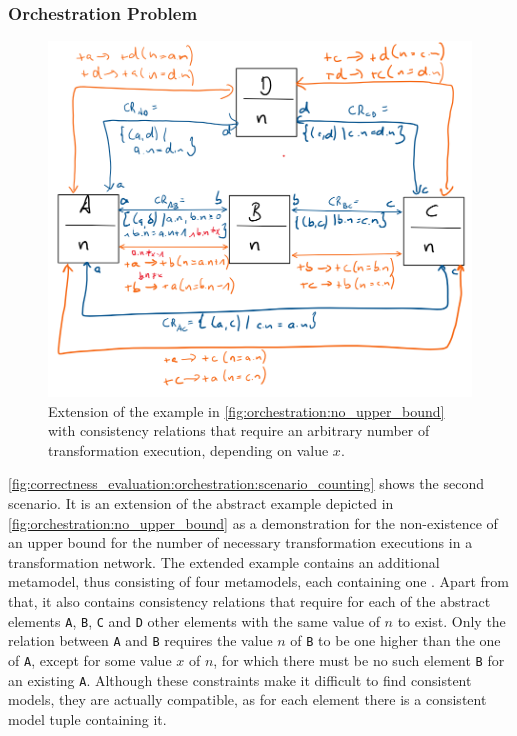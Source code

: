 

\subsubsection*{Orchestration Problem}

\begin{figure}
    \centering
    \includegraphics[width=\textwidth]{figures/correctness/evaluation/orchestration_scenario_counting.png}
    \caption[Example scenario with arbitrary execution Bound]{Extension of the example in \autoref{fig:orchestration:no_upper_bound} with consistency relations that require an arbitrary number of transformation execution, depending on value $x$.}
    \label{fig:correctness_evaluation:orchestration:scenario_counting}
\end{figure}

\autoref{fig:correctness_evaluation:orchestration:scenario_counting} shows the second scenario.
It is an extension of the abstract example depicted in \autoref{fig:orchestration:no_upper_bound} as a demonstration for the non-existence of an upper bound for the number of necessary transformation executions in a transformation network.
The extended example contains an additional metamodel, thus consisting of four metamodels, each containing one \metaclass. 
Apart from that, it also contains consistency relations that require for each of the abstract elements \texttt{A}, \texttt{B}, \texttt{C} and \texttt{D} other elements with the same value of $n$ to exist.
Only the relation between \texttt{A} and \texttt{B} requires the value $n$ of \texttt{B} to be one higher than the one of \texttt{A}, except for some value $x$ of $n$, for which there must be no such element \texttt{B} for an existing \texttt{A}.
Although these constraints make it difficult to find consistent models, they are actually compatible, as for each element there is a consistent model tuple containing it.

